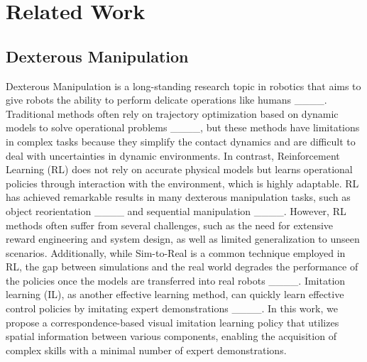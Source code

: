 \section{Related Work}
\subsection{Dexterous Manipulation}
Dexterous Manipulation is a long-standing research topic in robotics that aims to give robots the ability to perform delicate operations like humans ____. 
Traditional methods often rely on trajectory optimization based on dynamic models to solve operational problems ____, but these methods have limitations in complex tasks because they simplify the contact dynamics and are difficult to deal with uncertainties in dynamic environments. 
In contrast, Reinforcement Learning (RL) does not rely on accurate physical models but learns operational policies through interaction with the environment, which is highly adaptable. 
RL has achieved remarkable results in many dexterous manipulation tasks, such as object reorientation ____ and sequential manipulation ____.
However, RL methods often suffer from several challenges, such as the need for extensive reward engineering and system design, as well as limited generalization to unseen scenarios.
Additionally, while Sim-to-Real is a common technique employed in RL, the gap between simulations and the real world degrades the performance of the policies once the models are transferred into real robots ____.
Imitation learning (IL), as another effective learning method, can quickly learn effective control policies by imitating expert demonstrations ____. 
In this work, we propose a correspondence-based visual imitation learning policy that utilizes spatial information between various components, enabling the acquisition of complex skills with a minimal number of expert demonstrations. 

